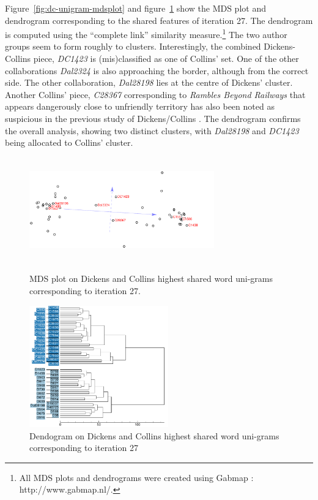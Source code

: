 \documentclass[a4paper,10pt,twoside,fleqn]{article}
\begin{document}
Figure~\ref{fig:dc-unigram-mdsplot} and figure~\ref{fig:dc-unigram-dendo} 
show the MDS plot and dendrogram corresponding to the shared features of 
iteration 27.
The dendrogram is computed using the ``complete link'' similarity 
measure.\footnote{All MDS plots and dendrograms 
were created using Gabmap \cite{nerbonne2011gabmap}: http://www.gabmap.nl/. }
The two author groups seem to form roughly to clusters. 
Interestingly, the combined Dickens-Collins piece, \emph{DC1423} is 
(mis)classified as one of Collins' set. One of the other collaborations 
\emph{Dal2324} is also approaching the border, although from the correct
side. The other collaboration, \emph{Dal28198} lies at the centre of
Dickens' cluster. 
Another Collins' piece, \emph{C28367} corresponding to 
\emph{Rambles Beyond Railways} that appears dangerously close to 
unfriendly territory has also been noted as suspicious in the 
previous study of Dickens/Collins \cite{Tabata2012}.
The dendrogram confirms the overall analysis, showing two distinct 
clusters, with \emph{Dal28198} and \emph{DC1423} being allocated
to Collins' cluster. 



\begin{figure}
\centering
\parbox{8cm}{
\includegraphics[width=8cm,height=4.5cm]{mdsplot/dc-wuni-DC1423.pdf}
\caption{MDS plot on Dickens and Collins highest shared word uni-grams 
corresponding to iteration 27.}
\label{fig:dc-unigram-mdsplot}}
\qquad
\begin{minipage}{6cm}
\includegraphics[width=6cm]{dend/dc-wuni-cl-DC1423.pdf}
\caption{Dendogram on Dickens and Collins highest shared word uni-grams 
corresponding to iteration 27}
\label{fig:dc-unigram-dendo}
\end{minipage}
\end{figure}
\end{document}
